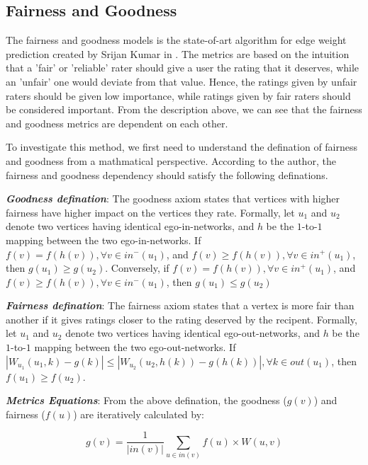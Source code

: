 
\subsection{Fairness and Goodness}

The fairness and goodness models is the state-of-art algorithm for 
edge weight prediction created by Srijan Kumar in \cite{kumar2016edge}.
The metrics are based on the intuition that a 'fair' or 'reliable' 
rater should give a user the rating that it deserves, while an 'unfair'
one would deviate from that value. Hence, the ratings given by unfair 
raters should be given low importance, while ratings given by fair 
raters should be considered important. From the description above,
we can see that the fairness and goodness metrics are dependent on each
other.

To investigate this method, we first need to understand the defination
of fairness and goodness from a mathmatical perspective. According to 
the author, the fairness and goodness dependency should satisfy the 
following definations.

\emph{\textbf{Goodness defination}}: The goodness axiom states that 
vertices with higher fairness have higher impact on the vertices they rate.
Formally, let $u_1$ and $u_2$ denote two vertices having identical ego-in-networks,
and $h$ be the $1$-to-$1$ mapping between the two ego-in-networks. If
$f(v) = f(h(v)), \forall v \in in^-(u_1)$, and $f(v) \geq f(h(v)), \forall v \in in^+(u_1)$,
then $g(u_1) \geq g(u_2)$. Conversely, if $f(v) = f(h(v)), \forall v \in in^+(u_1)$, 
and $f(v) \geq f(h(v)), \forall v \in in^-(u_1)$, then $g(u_1) \leq g(u_2)$

\emph{\textbf{Fairness defination}}: The fairness axiom states that 
a vertex is more fair than another if it gives ratings closer to the rating
deserved by the recipent.
Formally, let $u_1$ and $u_2$ denote two vertices having identical ego-out-networks,
and $h$ be the $1$-to-$1$ mapping between the two ego-out-networks.
If $|W_{u_1}(u_1, k)-g(k)| \leq |W_{u_2}(u_2, h(k))-g(h(k))|, \forall k \in out(u_1)$,
then $f(u_1) \geq f(u_2)$.

\emph{\textbf{Metrics Equations}}: From the above defination, the goodness ($g(v)$) and fairness ($f(u)$) are 
iteratively calculated by:

\begin{equation}
    g(v) = \frac{1}{|in(v)|}\sum_{u \in in(v)}f(u) \times W(u,v)
\end{equation}


